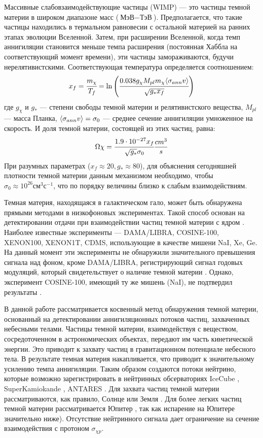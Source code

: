Массивные слабовзаимодействующие частицы (WIMP) --- это частицы темной материи в широком диапазоне масс ($\text{МэВ}-\text{ТэВ}$). Предполагается, что такие частицы находились в термальном равновесии с остальной материей на ранних этапах эволюции Вселенной. Затем, при расширении Вселенной, когда темп аннигиляции становится меньше темпа расширения (постоянная Хаббла на соответствующий момент времени), эти частицы замораживаются, будучи нерелятивистскими\cite{Kolb:1990vq}. Соответствующая температура определяется соотношением: 
\begin{equation}
	x_f = \cfrac{m_{\chi} }{T_f} = \ln {\left(\cfrac{0.038 g_{\chi} M_{pl} m_{\chi}  \langle \sigma_{ann} v \rangle}
		{\sqrt{g_* x_f}}\right)}
\end{equation}
где $g_{\chi}$ и $g_*$ --- степени свободы темной материи и релятивистского вещества, $M_{pl}$ --- масса Планка, $\langle \sigma_{ann} v \rangle = \sigma_0$ --- среднее сечение аннигиляции умноженное на скорость. И доля темной материи, состоящей из этих частиц, равна: 
\begin{equation}
	\Omega{\chi} = \cfrac{{1.9}\cdot 10^{-27} x_f}{\sqrt{g_*} \sigma_0} \frac{cm^3}{s}
\end{equation}
При разумных параметрах ($x_f \approx 20, g_* \approx 80$), для объяснения сегодняшней плотности темной материи данным механизмом необходимо, чтобы $\sigma_0 \approx 10^{26} \text{см}^3\text{с}^{-1}$, что по порядку величины близко к слабым взаимодействиям.

Темная материя, находящаяся в галактическом гало, может быть обнаружена прямыми методами в низкофоновых экспериментах. Такой способ основан на детектировании отдачи при взаимодействии частиц темной материи с ядром \cite{Schumann_2019}. Наиболее известные эксперименты --- DAMA/LIBRA, COSINE-100, XENON100, XENON1T, CDMS, использующие в качестве мишени NaI, Xe, Ge. На данный момент эти эксперименты не обнаружили значительного превышения сигнала над фоном, кроме DAMA/LIBRA, регистрирующий сигнал годовых модуляций, который свидетельствует о наличие темной материи \cite{Bernabei_2018}. Однако, эксперимент COSINE-100, имеющий ту же мишень (NaI), не подтвердил результаты \cite{Adhikari_2022}.

В данной работе рассматривается косвенный метод обнаружения темной материи, основанный на детектировании аннигиляционных потоков частиц, захваченных небесными телами. Частицы темной материи, взаимодействуя с веществом, сосредоточенном в астрономических объектах, передают им часть кинетической энергии. Это приводит к захвату частиц в гравитационном потенциале небесного тела. В результате темная материя накапливается, что приводит к значительному усилению темпа аннигиляции. Таким образом создаются потоки нейтрино, которые возможно зарегистрировать в нейтринных обсерваториях  IceCube \cite{Aartsen_2017}, SuperKamiokande \cite{kamiokandecollaboration2015search}, ANTARES \cite{ADRIANMARTINEZ201669}. Для захвата частиц темной материи рассматриваются, как правило, Солнце \cite{1985ApJ...296..679P} или Земля \cite{1987ApJ...321..571G}. Для более легких частиц темной материи рассматривается Юпитер \cite{French_2022}, так как испарение на Юпитере значительно ниже). Отсутствие нейтринного сигнала дает ограничение на сечение взаимодействия с протоном $\sigma_{\chi p}$.

